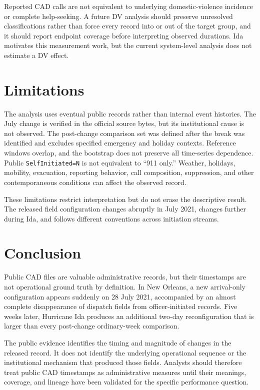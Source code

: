 \documentclass[11pt]{article}
\begin{document}
Reported CAD calls are not equivalent to underlying domestic-violence incidence or complete help-seeking. A future DV analysis should preserve unresolved classifications rather than force every record into or out of the target group, and it should report endpoint coverage before interpreting observed durations. Ida motivates this measurement work, but the current system-level analysis does not estimate a DV effect.

\section{Limitations}

The analysis uses eventual public records rather than internal event histories. The July change is verified in the official source bytes, but its institutional cause is not observed. The post-change comparison set was defined after the break was identified and excludes specified emergency and holiday contexts. Reference windows overlap, and the bootstrap does not preserve all time-series dependence. Public \texttt{SelfInitiated=N} is not equivalent to ``911 only.'' Weather, holidays, mobility, evacuation, reporting behavior, call composition, suppression, and other contemporaneous conditions can affect the observed record.

These limitations restrict interpretation but do not erase the descriptive result. The released field configuration changes abruptly in July 2021, changes further during Ida, and follows different conventions across initiation streams.

\section{Conclusion}

Public CAD files are valuable administrative records, but their timestamps are not operational ground truth by definition. In New Orleans, a new arrival-only configuration appears suddenly on 28 July 2021, accompanied by an almost complete disappearance of dispatch fields from officer-initiated records. Five weeks later, Hurricane Ida produces an additional two-day reconfiguration that is larger than every post-change ordinary-week comparison.

The public evidence identifies the timing and magnitude of changes in the released record. It does not identify the underlying operational sequence or the institutional mechanism that produced those fields. Analysts should therefore treat public CAD timestamps as administrative measures until their meanings, coverage, and lineage have been validated for the specific performance question.



\end{document}
